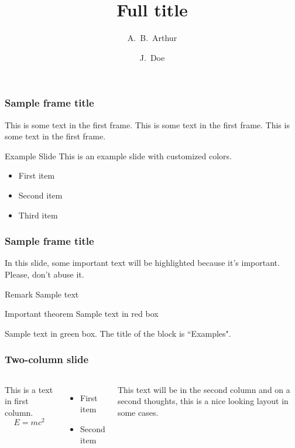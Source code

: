 \documentclass{beamer}
\title[Short title] %
{Full title}
\author{
    A.~B.~Arthur\inst{1} \and J.~Doe\inst{2}
}
\institute[VFU] %
{
  \inst{1}%
  Faculty of Engineering\\
  University of Waterloo
  \and
  \inst{2}%
  Faculty of Chemistry\\
  Very Famous University
}
\begin{document}
\frame{\titlepage}

\begin{frame}
\frametitle{Sample frame title}
This is some text in the first frame. This is some text in the first frame. This is some text in the first frame.
\end{frame}

\begin{frame}{Example Slide}
    This is an example slide with customized colors.
    \begin{itemize}
        \item First item
        \item Second item
        \item Third item
    \end{itemize}
\end{frame}

\begin{frame}
\frametitle{Sample frame title}

In this slide, some important text will be
\alert{highlighted} because it's important.
Please, don't abuse it.

\begin{block}{Remark}
Sample text
\end{block}

\begin{alertblock}{Important theorem}
Sample text in red box
\end{alertblock}

\begin{examples}
Sample text in green box. The title of the block is ``Examples".
\end{examples}
\end{frame}

\begin{frame}
\frametitle{Two-column slide}
\begin{columns}
This is a text in first column.
$$E=mc^2$$
\begin{itemize}
\item First item
\item Second item
\end{itemize}

This text will be in the second column
and on a second thoughts, this is a nice looking
layout in some cases.
\end{columns}
\end{frame}
\end{document}

